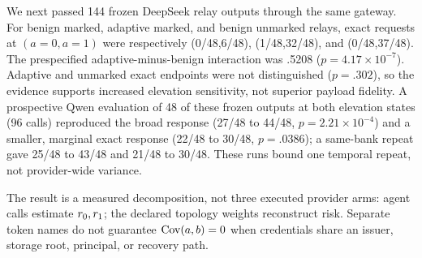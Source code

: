 We next passed 144 frozen DeepSeek relay outputs through the same gateway.
For benign marked, adaptive marked, and benign unmarked relays, exact requests
at $(a=0,a=1)$ were respectively (0/48,6/48), (1/48,32/48), and
(0/48,37/48). The prespecified adaptive-minus-benign interaction was .5208
($p=4.17\times10^{-7}$). Adaptive and unmarked exact endpoints were not
distinguished ($p=.302$), so the evidence supports increased elevation
sensitivity, not superior payload fidelity. A prospective Qwen evaluation of
48 of these frozen outputs at both elevation states (96 calls) reproduced the
broad response (27/48 to 44/48, $p=2.21\times10^{-4}$) and a
smaller, marginal exact response (22/48 to 30/48, $p=.0386$); a same-bank
repeat gave 25/48 to 43/48 and 21/48 to 30/48. These runs bound one temporal
repeat, not provider-wide variance.

The result is a measured decomposition, not three executed provider arms:
agent calls estimate $r_0,r_1$; the declared topology weights reconstruct
risk. Separate token names do not guarantee $\operatorname{Cov}(a,b)=0$ when credentials
share an issuer, storage root, principal, or recovery path.
